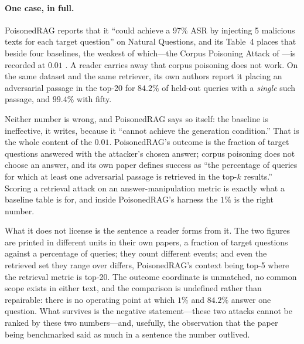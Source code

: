 \documentclass[11pt]{article}
\begin{document}
\paragraph{One case, in full.}
PoisonedRAG reports that it ``could achieve a 97\% ASR by injecting 5 malicious
texts for each target question'' on Natural Questions, and its Table~4 places
that beside four baselines, the weakest of which---the Corpus Poisoning Attack
of \citet{poisoningRetrievalCorpora2023}---is recorded at $0.01$
\citep{poisonedRAG2024}. A reader carries away that corpus poisoning does not
work. On the same dataset and the same retriever, its own authors report it
placing an adversarial passage in the top-20 for $84.2\%$ of held-out queries
with a \emph{single} such passage, and $99.4\%$ with fifty.

Neither number is wrong, and PoisonedRAG says so itself: the baseline is
ineffective, it writes, because it ``cannot achieve the generation condition.''
That is the whole content of the $0.01$. PoisonedRAG's outcome is the fraction
of target questions answered with the attacker's chosen answer; corpus
poisoning does not choose an answer, and its own paper defines success as ``the
percentage of queries for which at least one adversarial passage is retrieved in
the top-$k$ results.'' Scoring a retrieval attack on an answer-manipulation
metric is exactly what a baseline table is for, and inside PoisonedRAG's harness
the $1\%$ is the right number.

What it does not license is the sentence a reader forms from it. The two figures
are printed in different units in their own papers, a fraction of target
questions against a percentage of queries; they count different events; and even
the retrieved set they range over differs, PoisonedRAG's context being top-5
where the retrieval metric is top-20. The outcome coordinate is unmatched, no
common scope exists in either text, and the comparison is undefined rather
than repairable: there is no operating point at which $1\%$ and $84.2\%$ answer
one question. What survives is the negative statement---these two attacks cannot
be ranked by these two numbers---and, usefully, the observation that the paper
being benchmarked said as much in a sentence the number outlived.
\end{document}

